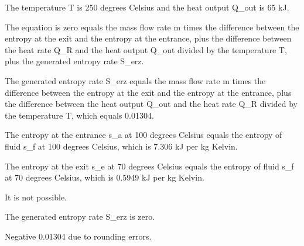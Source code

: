 The temperature T is 250 degrees Celsius and the heat output Q_out is 65 kJ.

The equation is zero equals the mass flow rate m times the difference between the entropy at the exit and the entropy at the entrance, plus the difference between the heat rate Q_R and the heat output Q_out divided by the temperature T, plus the generated entropy rate S_erz.

The generated entropy rate S_erz equals the mass flow rate m times the difference between the entropy at the exit and the entropy at the entrance, plus the difference between the heat output Q_out and the heat rate Q_R divided by the temperature T, which equals 0.01304.

The entropy at the entrance s_a at 100 degrees Celsius equals the entropy of fluid s_f at 100 degrees Celsius, which is 7.306 kJ per kg Kelvin.

The entropy at the exit s_e at 70 degrees Celsius equals the entropy of fluid s_f at 70 degrees Celsius, which is 0.5949 kJ per kg Kelvin.

It is not possible.

The generated entropy rate S_erz is zero.

Negative 0.01304 due to rounding errors.